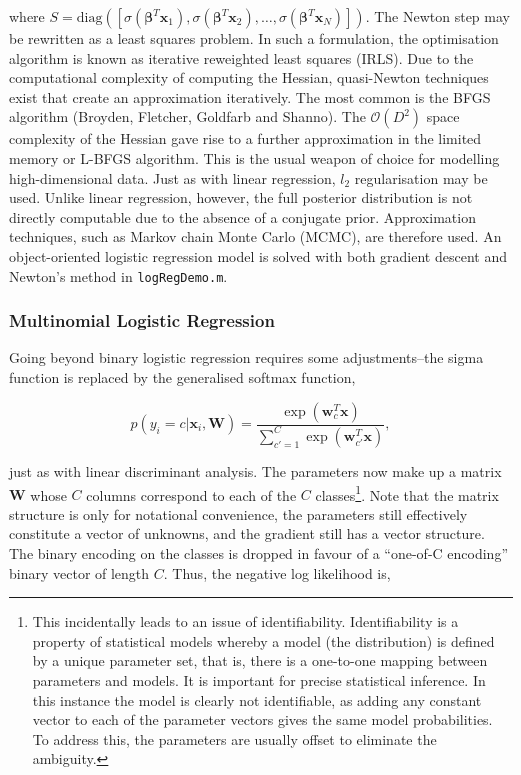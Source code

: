 \documentclass[11pt]{amsart}
\begin{document}
where $S = \text{diag}([\sigma(\boldsymbol\beta^T\mathbf{x}_1), \sigma(\boldsymbol\beta^T\mathbf{x}_2), \dots, \sigma(\boldsymbol\beta^T\mathbf{x}_N)])$. The Newton step may be rewritten as a least squares problem. In such a formulation, the optimisation algorithm is known as iterative reweighted least squares (IRLS). Due to the computational complexity of computing the Hessian, quasi-Newton techniques exist that create an approximation iteratively. The most common is the BFGS algorithm (Broyden, Fletcher, Goldfarb and Shanno). The $\mathcal{O}(D^2)$ space complexity of the Hessian gave rise to a further approximation in the limited memory or L-BFGS algorithm. This is the usual weapon of choice for modelling high-dimensional data. Just as with linear regression, $l_2$ regularisation may be used. Unlike linear regression, however, the full posterior distribution is not directly computable due to the absence of a conjugate prior. Approximation techniques, such as Markov chain Monte Carlo (MCMC), are therefore used. An object-oriented logistic regression model is solved with both gradient descent and Newton's method in \texttt{logRegDemo.m}.

\subsubsection{Multinomial Logistic Regression}

Going beyond binary logistic regression requires some adjustments--the sigma function is replaced by the generalised softmax function,

$$p(y_i = c | \mathbf{x}_i, \mathbf{W}) = \frac{\exp(\mathbf{w}_c^T\mathbf{x})}{\sum_{c' = 1}^C \exp(\mathbf{w}_{c'}^T\mathbf{x})},$$

just as with linear discriminant analysis. The parameters now make up a matrix $\mathbf{W}$ whose $C$ columns correspond to each of the $C$ classes\footnote{This incidentally leads to an issue of identifiability. Identifiability is a property of statistical models whereby a model (the distribution) is defined by a unique parameter set, that is, there is a one-to-one mapping between parameters and models. It is important for precise statistical inference. In this instance the model is clearly not identifiable, as adding any constant vector to each of the parameter vectors gives the same model probabilities. To address this, the parameters are usually offset to eliminate the ambiguity.}. Note that the matrix structure is only for notational convenience, the parameters still effectively constitute a vector of unknowns, and the gradient still has a vector structure. The binary encoding on the classes is dropped in favour of a ``one-of-C encoding'' binary vector of length $C$. Thus, the negative log likelihood is,
\end{document}
